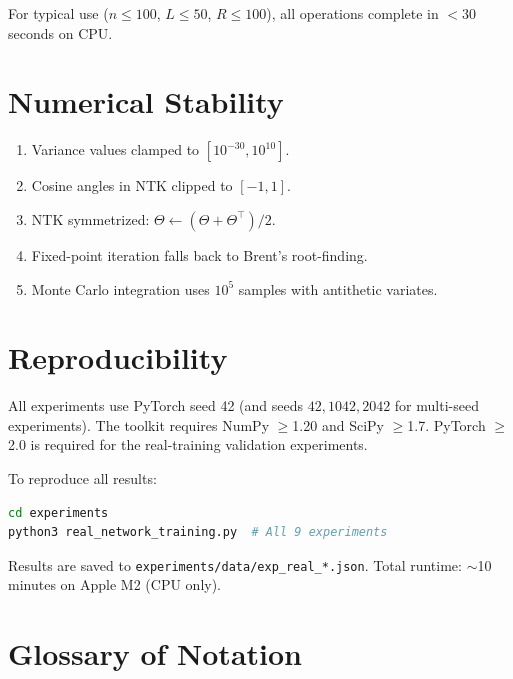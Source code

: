 \documentclass[10pt]{article}
\theoremstyle{definition}
\begin{document}
For typical use ($n \leq 100$, $L \leq 50$, $R \leq 100$), all operations complete in $<$30 seconds on CPU.

\section{Numerical Stability}
\label{app:stability}

\begin{enumerate}[nosep]
  \item Variance values clamped to $[10^{-30}, 10^{10}]$.
  \item Cosine angles in NTK clipped to $[-1, 1]$.
  \item NTK symmetrized: $\Theta \leftarrow (\Theta + \Theta^\top)/2$.
  \item Fixed-point iteration falls back to Brent's root-finding.
  \item Monte Carlo integration uses $10^5$ samples with antithetic variates.
\end{enumerate}

\section{Reproducibility}
\label{app:reproducibility}

All experiments use PyTorch seed 42 (and seeds $42, 1042, 2042$ for multi-seed experiments).
The toolkit requires NumPy $\geq$1.20 and SciPy $\geq$1.7.
PyTorch $\geq$2.0 is required for the real-training validation experiments.

To reproduce all results:
\begin{lstlisting}[language=bash]
cd experiments
python3 real_network_training.py  # All 9 experiments
\end{lstlisting}

Results are saved to \texttt{experiments/data/exp\_real\_*.json}.
Total runtime: $\sim$10 minutes on Apple M2 (CPU only).

\section{Glossary of Notation}
\label{app:glossary}
\end{document}
